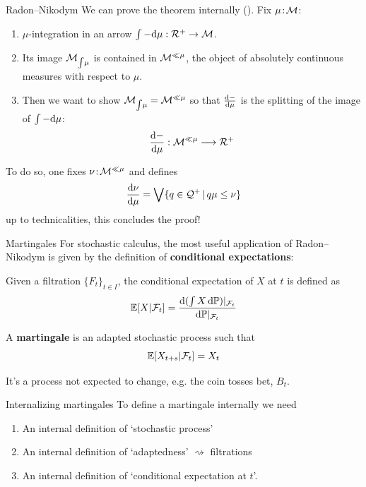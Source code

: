\begin{frame}{Radon--Nikodym}
	We can prove the theorem internally (\cite{jackson2006sheaf}).
	Fix $\mu \!:\! \mathcal{M}$:
	\begin{enumerate}
		\item $\mu$-integration in an arrow $\int - \mathrm{d} \mu : \mathcal{R}^+ \to \mathcal{M}$.
		\item Its image $\mathcal{M}_{\int\!\mu}$ is contained in $\mathcal{M}^{\ll \mu}$, the object of absolutely continuous measures with respect to $\mu$.
		\item Then we want to show $\mathcal{M}_{\int\!\mu} = \mathcal{M}^{\ll \mu}$ so that $\frac{\mathrm{d}{-}}{\mathrm{d}{\mu}}$ is the splitting of the image of $\int - \mathrm{d} \mu$:
		\begin{equation*}
			\frac{\mathrm{d}{-}}{\mathrm{d}{\mu}} : \mathcal{M}^{\ll \mu} \longrightarrow \mathcal{R}^+
		\end{equation*}
	\end{enumerate}
	To do so, one fixes $\nu \!:\! \mathcal{M}^{\ll \mu}$ and defines
	\begin{equation*}
		\frac{\mathrm{d}{\nu}}{\mathrm{d}{\mu}} = \bigvee \{q \in \mathcal{Q}^+ \,|\, q \mu \leq \nu\}
	\end{equation*}
	up to technicalities, this concludes the proof!
\end{frame}

\begin{frame}{Martingales}
	For stochastic calculus, the most useful application of Radon--Nikodym is given by the definition of \textbf{conditional expectations}:
	\begin{definition}
		Given a filtration $\{F_t\}_{t \in I}$, the conditional expectation of $X$ at $t$ is defined as
		\begin{equation*}
			\mathbb{E}[X | \mathcal{F}_t] = \frac{\mathrm{d}{(\int X \, \mathrm{d}\mathbb{P})\vert_{\mathcal{F}_t}}}{\mathrm{d}{\mathbb{P}\vert_{\mathcal{F}_t}}}
		\end{equation*}
	\end{definition}
	\begin{definition}
		A \textbf{martingale} is an adapted stochastic process such that
		\begin{equation*}
			\mathbb{E}[ X_{t+s} | \mathcal{F}_t] = X_t
		\end{equation*}
	\end{definition}
	It's a process not expected to change, e.g. the coin tosses bet, $B_t$.
\end{frame}

\begin{frame}{Internalizing martingales}
	To define a martingale internally we need

	\vfill
	\begin{enumerate}
		\item An internal definition of `stochastic process'
		\item An internal definition of `adaptedness' $\rightsquigarrow$ {\color{colorgold}filtrations}
		\item An internal definition of `conditional expectation at $t$'.
	\end{enumerate}

	\vfill
\end{frame}

